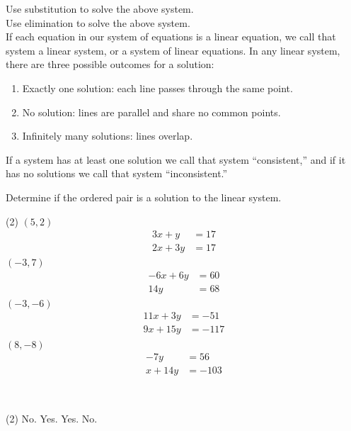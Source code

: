 \documentclass[12pt,fleqn]{book}
\newcommand{\prb}[1]{\begin{Exercise}#1\end{Exercise}}
\newcommand{\sol}[1]{\begin{Answer}#1\end{Answer}}
\begin{document}
Use substitution to solve the above system.\\[1in]
Use elimination to solve the above system.\\[1in]
If each equation in our system of equations is a linear equation, we call that system a linear system, or a system of linear equations.  In any linear system, there are three possible outcomes for a solution:
\begin{enumerate}
  \item Exactly one solution: each line passes through the same point.
  \item No solution: lines are parallel and share no common points.
  \item Infinitely many solutions: lines overlap.
\end{enumerate}
If a system has at least one solution we call that system ``consistent,'' and if it has no solutions we call that system ``inconsistent.''
\prb{Determine if the ordered pair is a solution to the linear system.
\begin{tasks}(2)
\task $(5,2)$
\begin{align*}
3x+y&=17\\
2x+3y&=17
\end{align*}
\vspace{1in}
\task $(-3,7)$
\begin{align*}
-6x+6y&=60\\
14y&=68
\end{align*}
\vspace{1in}
\task $(-3,-6)$
\begin{align*}
11x+3y&=-51\\
9x+15y&=-117
\end{align*}
\vspace{1in}
\task $(8,-8)$
\begin{align*}
-7y&=56\\
x+14y&=-103
\end{align*}
\end{tasks}
\vspace{1in}
}
\sol{\
  \begin{tasks}(2)
  \task No.
  \task Yes.
  \task Yes.
  \task No.
  \end{tasks}
}
\end{document}
